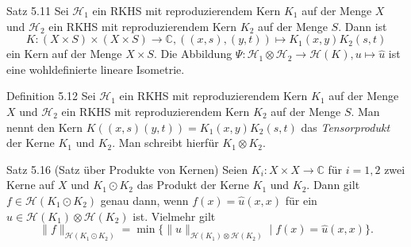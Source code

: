 \documentclass{beamer}
\begin{document}
\begin{frame}
\begin{block}{Satz 5.11}
Sei $\mathcal{H}_1$ ein RKHS mit reproduzierendem Kern $K_1$ auf der Menge $X$ und $\mathcal{H}_2$ ein RKHS mit reproduzierendem Kern $K_2$ auf der Menge $S$. Dann ist 
\[
K:(X\times S)\times (X \times S)\to \mathbb{C},((x,s),(y,t))\mapsto K_1(x,y)K_2(s,t) 
\] 
ein Kern auf der Menge $X\times S.$ Die Abbildung $\Psi:\mathcal{H}_1 \otimes \mathcal{H}_2 \to  \mathcal{H}(K), u\mapsto \hat{u}$ ist eine wohldefinierte lineare Isometrie.
\end{block}
\end{frame}

\begin{frame}
\begin{block}{Definition 5.12}
Sei $\mathcal{H}_1$ ein RKHS mit reproduzierendem Kern $K_1$ auf der Menge $X$ und $\mathcal{H}_2$ ein RKHS mit reproduzierendem Kern $K_2$ auf der Menge $S$.
Man nennt den Kern $K((x,s)(y,t))=K_1(x,y)K_2(s,t)$ das \emph{Tensorprodukt} der Kerne $K_1$ und $K_2.$ Man schreibt hierfür  $K_1 \otimes K_2.$
\end{block}
\end{frame}

\begin{frame}
\begin{block}{Satz 5.16 (Satz über Produkte von Kernen)}
Seien $K_i:X\times X\to \mathbb{C}$ für $i=1,2$ zwei Kerne auf $X$ und $K_1\odot K_2$ das Produkt der Kerne $K_1$ und $K_2.$ Dann gilt $f\in \mathcal{H}(K_1 \odot K_2)$ genau dann, wenn $f(x)=\hat{u}(x,x)$ für ein $u\in \mathcal{H}(K_1)\otimes \mathcal{H}(K_2)$ ist. Vielmehr gilt 
\[
\|f\|_{\mathcal{H}(K_1\odot K_2)}=\min\{\|u\|_{\mathcal{H}(K_1)\otimes \mathcal{H}(K_2)}\mid f(x)=\hat{u}(x,x)\}.
\]   
\end{block}
\end{frame}
\end{document}
